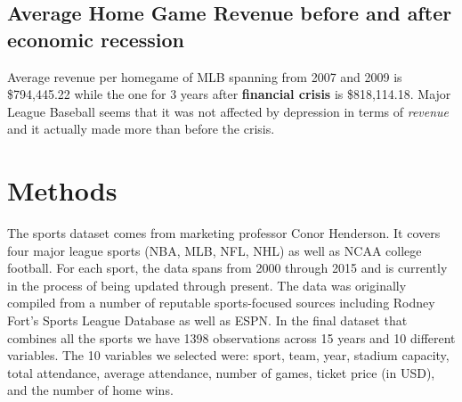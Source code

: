 \documentclass[man, fleqn, noextraspace,floatsintext]{apa6}
\newenvironment{Shaded}{\begin{snugshade}}{\end{snugshade}}
\newcommand{\DataTypeTok}[1]{\textcolor[rgb]{0.13,0.29,0.53}{#1}}
\newcommand{\DecValTok}[1]{\textcolor[rgb]{0.00,0.00,0.81}{#1}}
\newcommand{\KeywordTok}[1]{\textcolor[rgb]{0.13,0.29,0.53}{\textbf{#1}}}
\newcommand{\NormalTok}[1]{#1}
\newcommand{\OperatorTok}[1]{\textcolor[rgb]{0.81,0.36,0.00}{\textbf{#1}}}
\newcommand{\StringTok}[1]{\textcolor[rgb]{0.31,0.60,0.02}{#1}}
\begin{document}
\hypertarget{average-home-game-revenue-before-and-after-economic-recession}{%
\subsection{Average Home Game Revenue before and after economic recession}\label{average-home-game-revenue-before-and-after-economic-recession}}

Average revenue per homegame of MLB spanning from 2007 and 2009 is \$794,445.22 while the one for 3 years after \textbf{financial crisis} is \$818,114.18. Major League Baseball seems that it was not affected by depression in terms of \emph{revenue} and it actually made more than before the crisis.

\begin{Shaded}
\end{Shaded}

\hypertarget{methods}{%
\section{Methods}\label{methods}}

The sports dataset comes from marketing professor Conor Henderson. It covers four major league sports (NBA, MLB, NFL, NHL) as well as NCAA college football. For each sport, the data spans from 2000 through 2015 and is currently in the process of being updated through present. The data was originally compiled from a number of reputable sports-focused sources including Rodney Fort's Sports League Database as well as ESPN.
In the final dataset that combines all the sports we have 1398 observations across 15 years and 10 different variables. The 10 variables we selected were: sport, team, year, stadium capacity, total attendance, average attendance, number of games, ticket price (in USD), and the number of home wins.
\end{document}
